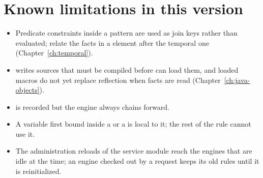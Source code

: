 \section{Known limitations in this version}
\label{sec:known-problems}

\begin{itemize}
\item Predicate constraints inside a  pattern are used as
  join keys rather than evaluated; relate the facts in a 
  element after the temporal one (Chapter~\ref{ch:temporal}).
\item {} writes sources that must be compiled before
   can load them, and loaded macros do not yet replace
  reflection when facts are read (Chapter~\ref{ch:java-objects}).
\item {} is recorded but the engine always chains
  forward.
\item A variable first bound inside a  or a
   is local to it; the rest of the rule cannot use it.
\item The administration reloads of the service module reach the engines
  that are idle at the time; an engine checked out by a request keeps
  its old rules until it is reinitialized.
\end{itemize}
